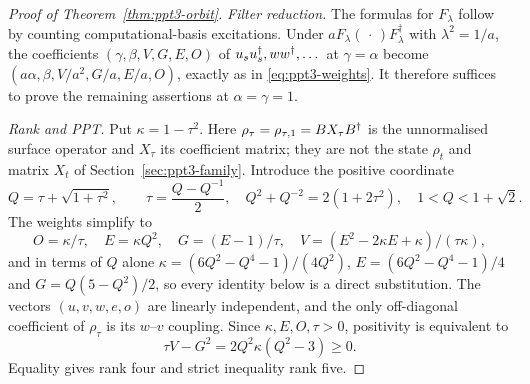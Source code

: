 \begin{proof}[Proof of Theorem~\ref{thm:ppt3-orbit}]
\emph{Filter reduction.} The formulas for $F_\lambda$ follow
by counting computational-basis excitations. Under
$aF_\lambda(\,\cdot\,)F_\lambda^\dagger$ with
$\lambda^2=1/a$, the coefficients $(\gamma,\beta,V,G,E,O)$ of $u_su_s^{\dagger},ww^{\dagger},\dots$ at
$\gamma=\alpha$ become
$(a\alpha,\beta,V/a^2,G/a,E/a,O)$, exactly as in
\eqref{eq:ppt3-weights}. It therefore suffices to prove the remaining assertions at $\alpha=\gamma=1$.

\emph{Rank and PPT.}
Put $\kappa=1-\tau^2$. Here $\rho_\tau=\rho_{\tau,1}=BX_\tau B^{\dagger}$ is the unnormalised surface operator and $X_\tau$ its
coefficient matrix; they are not the state $\rho_t$ and matrix $X_t$ of Section~\ref{sec:ppt3-family}. Introduce the positive
coordinate
\[
Q=\tau+\sqrt{1+\tau^2},\qquad
\tau=\frac{Q-Q^{-1}}{2},\quad
Q^2+Q^{-2}=2(1+2\tau^2),\quad
1<Q<1+\sqrt2 .
\]
The weights simplify to
\[
O=\kappa/\tau,\quad E=\kappa Q^2,\quad G=(E-1)/\tau,\quad
V=(E^2-2\kappa E+\kappa)/(\tau\kappa),
\]
and in terms of $Q$ alone $\kappa=(6Q^2-Q^4-1)/(4Q^2)$, $E=(6Q^2-Q^4-1)/4$ and $G=Q(5-Q^2)/2$, so every identity below is a
direct substitution.
The vectors $(u,v,w,e,o)$ are linearly independent, and the only off-diagonal coefficient of $\rho_\tau$ is its
$w$--$v$ coupling. Since $\kappa,E,O,\tau>0$,
positivity is equivalent to
\begin{equation}\label{eq:ppt3-surface-simpledet}
\tau V-G^2=2Q^2\kappa(Q^2-3)\ge0.
\end{equation}
Equality gives rank four and strict inequality rank five.


\end{proof}
